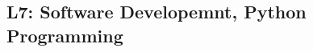 \documentclass{article}
\begin{document}

\begin{center}
    \section*{L7: Software Developemnt, Python Programming}
\end{center}

\newpage
\end{document}
